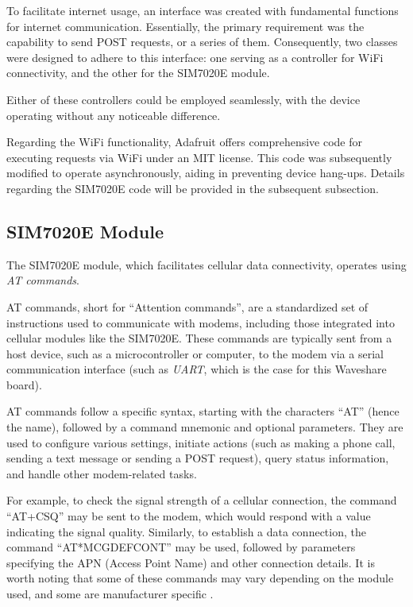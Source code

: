 To facilitate internet usage, an interface was created with fundamental functions for internet 
communication. Essentially, the primary requirement was the capability to send POST requests, or a 
series of them. Consequently, two classes were designed to adhere to this interface: one serving as 
a controller for WiFi connectivity, and the other for the SIM7020E module.

Either of these controllers could be employed seamlessly, with the device operating without any 
noticeable difference.

Regarding the WiFi functionality, Adafruit offers comprehensive code for executing requests via 
WiFi under an MIT license. This code was subsequently modified to operate asynchronously, aiding in 
preventing device hang-ups. Details regarding the SIM7020E code will be provided in the subsequent 
subsection.


\subsection{SIM7020E Module}

The SIM7020E module, which facilitates cellular data connectivity, operates using 
\textit{AT commands}.

AT commands, short for ``Attention commands'', are a standardized set of instructions used to 
communicate with modems, including those integrated into cellular modules like the SIM7020E. These 
commands are typically sent from a host device, such as a microcontroller or computer, to the modem 
via a serial communication interface (such as \textit{UART}, which is the case for this Waveshare 
board).

AT commands follow a specific syntax, starting with the characters ``AT'' (hence the name), 
followed by a command mnemonic and optional parameters. They are used to configure various 
settings, initiate actions (such as making a phone call, sending a text message or sending a POST 
request), query status information, and handle other modem-related tasks.

For example, to check the signal strength of a cellular connection, the command ``AT+CSQ'' may be 
sent to the modem, which would respond with a value indicating the signal quality. Similarly, to 
establish a data connection, the command ``AT*MCGDEFCONT'' may be used, followed by parameters 
specifying the APN (Access Point Name) and other connection details. It is worth noting that some 
of these commands may vary depending on the module used, and some are manufacturer specific 
\cite{sim7020e_atcommandsmanual}.

